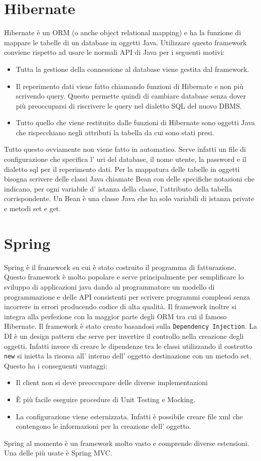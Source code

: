 \documentclass[12pt]{book}
\begin{document}
\section{Hibernate}
Hibernate è un ORM (o anche object relational mapping) e ha la funzione di 
mappare le tabelle di un database in oggetti Java.
Utilizzare questo framework conviene rispetto ad usare le normali API di Java
per i seguenti motivi:
\begin{itemize}
    \item Tutta la gestione della connessione al database viene gestita dal 
        framework.
    \item Il reperimento dati viene fatto chiamando funzioni di Hibernate e non
        più scrivendo query. Questo permette quindi di cambiare database senza
        dover più preoccuparsi di riscrivere le query nel dialetto SQL del 
        nuovo DBMS\@.
    \item Tutto quello che viene restituito dalle funzioni di Hibernate sono
        oggetti Java che rispecchiano negli attributi la tabella da cui sono
        stati presi.
\end{itemize}
Tutto questo ovviamente non viene fatto in automatico.
Serve infatti un file di configurazione che specifica l' uri del database,
il nome utente, la password e il dialetto sql per il reperimento dati.
Per la mappatura delle tabelle in oggetti bisogna scrivere delle
classi Java chiamate Bean con delle specifiche notazioni 
che indicano, per ogni variabile d' istanza della classe, l'attributo della 
tabella corrispondente.
Un Bean è una classe Java che ha solo variabili di istanza private e metodi set 
e get.
\section{Spring}
Spring è il framework su cui è stato costruito il programma di 
fatturazione.
Questo framework è molto popolare e serve principalmente per semplificare lo 
sviluppo di applicazioni java dando al programmatore un modello di 
programmazione e delle API consistenti per scrivere programmi complessi senza 
incorrere in errori producendo codice di alta qualità.
Il framework inoltre si integra alla perfezione con la maggior parte degli ORM
tra cui il famoso Hibernate.
Il framework è stato creato basandosi sulla \texttt{Dependency Injection}.
La DI è un design pattern che serve per invertire il controllo nella creazione
degli oggetti.
Infatti invece di creare le dipendenze tra le classi utilizzando il costrutto
\texttt{new} si inietta la risorsa all' interno dell' oggetto destinazione
con un metodo set.
Questo ha i conseguenti vantaggi:
\begin{itemize}
    \item Il client non si deve preoccupare delle diverse implementazioni
    \item È più facile eseguire procedure di Unit Testing e Mocking.
    \item La configurazione viene esternizzata. Infatti è possibile creare 
        file xml che contengono le informazioni per la creazione dell' oggetto.
\end{itemize}
Spring al momento è un framework molto vasto e comprende diverse estensioni.
Una delle più usate è Spring MVC\@.
\end{document}
